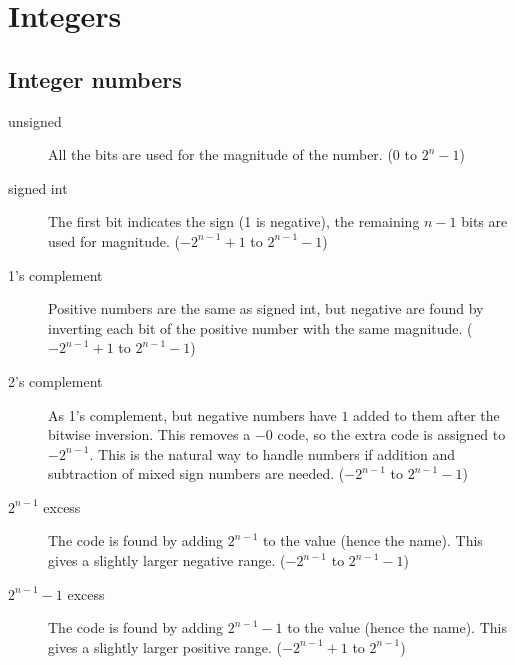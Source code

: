 \chapter{Integers}
\label{c-int}

\section{Integer numbers}

\begin{description}
    \item [unsigned] All the bits are used for the magnitude of the number. ($0$ to $2^n-1$)
    \item [signed int] The first bit indicates the sign (1 is negative), the remaining $n-1$ bits are used for magnitude. ($-2^{n-1}+1$ to $2^{n-1}-1$)
    \item [1's complement] Positive numbers are the same as signed int, but negative are found by inverting each bit of the positive number with the same magnitude. ($-2^{n-1}+1$ to $2^{n-1}-1$)
    \item [2's complement] As 1's complement, but negative numbers have $1$ added to them after the bitwise inversion.  This removes a $-0$ code, so the extra code is assigned to $-2^{n-1}$.  This is the natural way to handle numbers if addition and subtraction of mixed sign numbers are needed.  ($-2^{n-1}$ to $2^{n-1}-1$)
    \item [$2^{n-1}$ excess] The code is found by adding $2^{n-1}$ to the value (hence the name).  This gives a slightly larger negative range. ($-2^{n-1}$ to $2^{n-1}-1$)
    \item [$2^{n-1}-1$ excess] The code is found by adding $2^{n-1}-1$ to the value (hence the name).  This gives a slightly larger positive range. ($-2^{n-1}+1$ to $2^{n-1}$)
\end{description}

